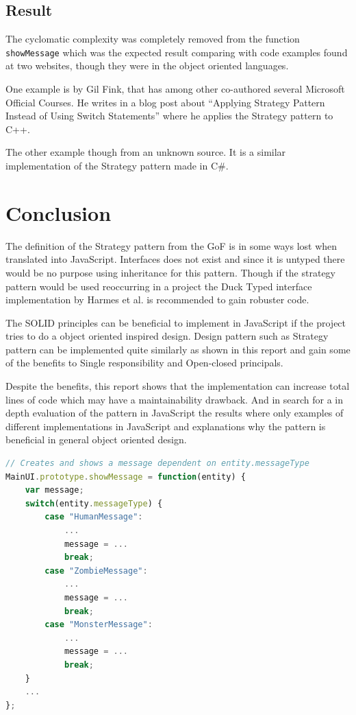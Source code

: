 \documentclass[conference, a4paper]{IEEEtran}
\begin{document}
\subsection{Result}
The cyclomatic complexity was completely removed from the function \texttt{showMessage} which was the expected result comparing with code examples found at two websites, though they were in the object oriented languages.

One example is by Gil Fink, that has among other co-authored several Microsoft Official Courses. He writes in a blog post about ``Applying Strategy Pattern Instead of Using Switch Statements'' where he applies the Strategy pattern to C++.~\cite{bibitem:GilFink}

The other example though from an unknown source. It is a similar implementation of the Strategy pattern made in C\#.~\cite{bibitem:CSharp}

\section{Conclusion}
The definition of the Strategy pattern from the GoF is in some ways lost when translated into JavaScript. Interfaces does not exist and since it is untyped there would be no purpose using inheritance for this pattern. Though if the strategy pattern would be used reoccurring in a project the Duck Typed interface implementation by Harmes et al. is recommended to gain robuster code.~\cite{bibitem:DiazHarmes}

The SOLID principles can be beneficial to implement in JavaScript if the project tries to do a object oriented inspired design. Design pattern such as Strategy pattern can be implemented quite similarly as shown in this report and gain some of the benefits to Single responsibility and Open-closed principals.

Despite the benefits, this report shows that the implementation can increase total lines of code which may have a maintainability drawback. And in search for a in depth evaluation of the pattern in JavaScript the results where only examples of different implementations in JavaScript and explanations why the pattern is beneficial in general object oriented design.

\clearpage
\appendix

\begin{lstlisting}[language=JavaScript, label=lst:switch-case, caption=\texttt{MainUI.js} The original switch case.]
// Creates and shows a message dependent on entity.messageType
MainUI.prototype.showMessage = function(entity) {
	var message;
	switch(entity.messageType) {
		case "HumanMessage":
			...
			message = ...
			break;
		case "ZombieMessage":
			...
			message = ...
			break;
		case "MonsterMessage":
			...
			message = ...
			break;
	}
	...
};
\end{lstlisting}
\end{document}

